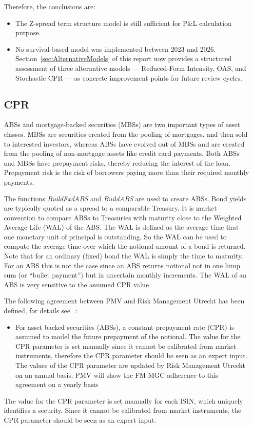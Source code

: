 \documentclass[reviewdoc]{pmv_report}  %
\begin{document}
Therefore, the conclusions are:
\begin{itemize}
\item [-] The Z-spread term structure model is still sufficient for P\&L calculation purpose.
\item [-] No survival-based model was implemented between 2023 and 2026. Section~\ref{sec:AlternativeModels} of this report now provides a structured assessment of three alternative models --- Reduced-Form Intensity, OAS, and Stochastic CPR --- as concrete improvement points for future review cycles.
\end{itemize}


\subsection{CPR}
ABSs and mortgage-backed securities (MBSs) are two important types of asset classes.
MBSs are securities created from the pooling of mortgages, and
then sold to interested investors, whereas ABSs have evolved out of MBSs and are created from the pooling of non-mortgage assets like credit card payments.
Both ABSs and MBSs have prepayment risks,
thereby reducing the interest of the loan.
Prepayment risk is the risk of borrowers paying more than their required monthly payments.

The functions \textit{BuildFxdABS} and \textit{BuildABS} are used to create ABSs.
Bond yields are typically quoted as a spread to a comparable Treasury. It is market convention
to compare ABSs to Treasuries with maturity close to the Weighted Average Life (WAL)
of the ABS. The WAL is defined as the average time that one monetary unit of principal is
outstanding. So the WAL can be used to compute the average time over which the notional
amount of a bond is returned. Note that for an ordinary (fixed) bond the WAL is simply the
time to maturity. For an ABS this is not the case since an ABS returns notional not in one lump
sum (or ``bullet payment'') but in uncertain monthly increments. The WAL of an ABS is very
sensitive to the assumed CPR value.

The following agreement between PMV and  Risk Management Utrecht has been defined, for details see ~\cite{Quark.BondLibrary}:
\begin{itemize}
\item
For asset backed securities (ABSs), a constant prepayment rate (CPR) is assumed
to model the future prepayment of the notional.
The value for the CPR parameter is set manually since it cannot be calibrated from market instruments,
therefore the CPR parameter should be seen as an expert input.
The values of the CPR parameter are updated by Risk Management Utrecht on an annual basis.
PMV will show the FM MGC adherence to this agreement on a yearly basis
\end{itemize}
The value for the CPR parameter is set manually for each ISIN, which uniquely identifies a security.
Since it cannot be calibrated from market instruments, the CPR parameter should be seen as an expert input.
\end{document}
